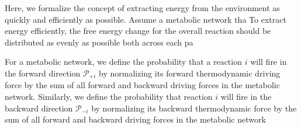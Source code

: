 Here, we formalize the concept of extracting energy from the environment as quickly and efficiently as possible. Assume  a metabolic network tha To extract energy efficiently, the free energy change for the overall reaction should be distributed as evenly as possible both across each pa


For a metabolic network, we define the probability that a reaction $i$ will fire in the forward  direction ${\mathcal P_{+i}}$ by normalizing its forward thermodynamic driving force by the sum of all forward and backward driving forces in the metabolic network. Similarly, we define the probability that reaction $i$ will fire in the backward direction $\mathcal P_{-i}$ by normalizing its backward thermodynamic force by  the sum of all forward and backward driving forces in the metabolic network